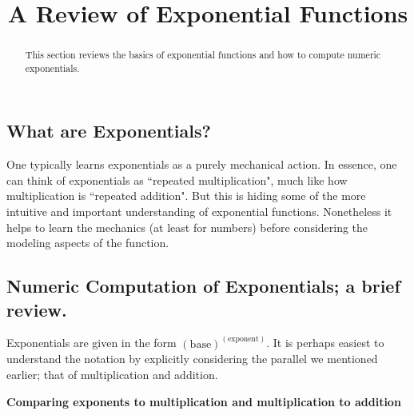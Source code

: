 \documentclass{ximeraXloud}
\title{A Review of Exponential Functions}
\begin{document}
\begin{abstract}
    This section reviews the basics of exponential functions and how to compute numeric exponentials.
\end{abstract}
\maketitle


\subsection*{What are Exponentials?}

    One typically learns exponentials as a purely mechanical action. In essence, one can think of exponentials as ``repeated multiplication", much like how multiplication is ``repeated addition". But this is hiding some of the more intuitive and important understanding of exponential functions. Nonetheless it helps to learn the mechanics (at least for numbers) before considering the modeling aspects of the function.

\subsection*{Numeric Computation of Exponentials; a brief review.}

    Exponentials are given in the form $(\text{base})^{(\text{exponent})}$. It is perhaps easiest to understand the notation by explicitly considering the parallel we mentioned earlier; that of multiplication and addition.
    
        {\bfseries Comparing exponents to multiplication and multiplication to addition}\\%
        
\end{document}

